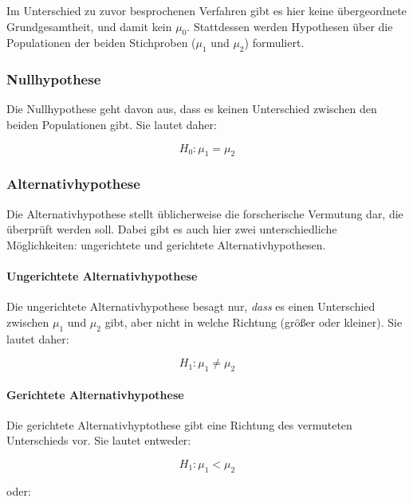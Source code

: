 \documentclass[
  11pt,
  ngerman,
  a4paper,
]{report}
\begin{document}
Im Unterschied zu zuvor besprochenen Verfahren gibt es hier keine übergeordnete Grundgesamtheit, und damit kein \(\mu_0\). Stattdessen werden Hypothesen über die Populationen der beiden Stichproben (\(\mu_1\) und \(\mu_2\)) formuliert.

\hypertarget{nullhypothese-2}{%
\subsubsection{Nullhypothese}\label{nullhypothese-2}}

Die Nullhypothese geht davon aus, dass es keinen Unterschied zwischen den beiden Populationen gibt. Sie lautet daher:

\[
H_0 : \mu_1 = \mu_2
\label{eq:h20}
\]

\hypertarget{alternativhypothese-2}{%
\subsubsection{Alternativhypothese}\label{alternativhypothese-2}}

Die Alternativhypothese stellt üblicherweise die forscherische Vermutung dar, die überprüft werden soll. Dabei gibt es auch hier zwei unterschiedliche Möglichkeiten: ungerichtete und gerichtete Alternativhypothesen.

\hypertarget{ungerichtete-alternativhypothese-1}{%
\paragraph{Ungerichtete Alternativhypothese}\label{ungerichtete-alternativhypothese-1}}

Die ungerichtete Alternativhypothese besagt nur, \emph{dass} es einen Unterschied zwischen \(\mu_1\) und \(\mu_2\) gibt, aber nicht in welche Richtung (größer oder kleiner). Sie lautet daher:

\[
H_1 : \mu_1 \neq \mu_2
\label{eq:h21u}
\]

\hypertarget{gerichtete-alternativhypothese-1}{%
\paragraph{Gerichtete Alternativhypothese}\label{gerichtete-alternativhypothese-1}}

Die gerichtete Alternativhyptothese gibt eine Richtung des vermuteten Unterschieds vor. Sie lautet entweder:

\[
H_1 : \mu_1 < \mu_2
\label{eq:h21l}
\]

oder:
\end{document}

